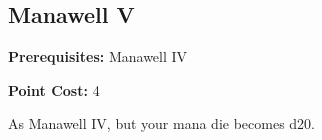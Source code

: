 \subsection{Manawell V}\label{feat:manawell5}

\noindent
\textbf{Prerequisites:} Manawell IV

\noindent
\textbf{Point Cost:} 4 

As Manawell IV, but your mana die becomes d20.

